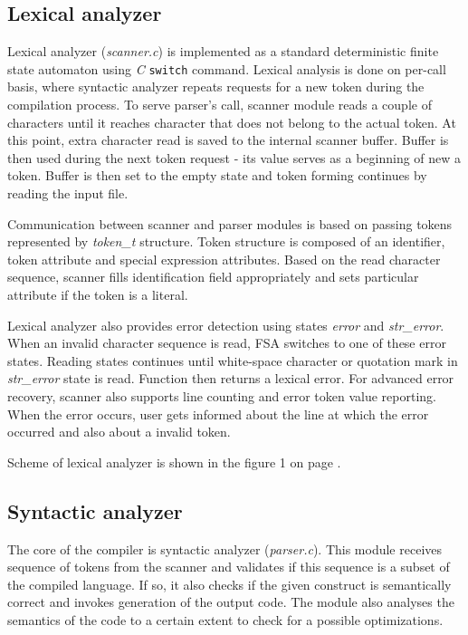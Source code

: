 \documentclass[a4paper, 11pt]{article}
\begin{document}
\subsection{Lexical analyzer}

Lexical analyzer (\emph{scanner.c}) is implemented as a standard deterministic finite state automaton using \emph{C} \texttt{switch} command. Lexical analysis is done on per-call basis, where syntactic analyzer repeats requests for a new token during the compilation process. To serve parser's call, scanner module reads a couple of characters until it reaches character that does not belong to the actual token. At this point, extra character read is saved to the internal scanner buffer. Buffer is then used during the next token request - its value serves as a beginning of new a token. Buffer is then set to the empty state and token forming continues by reading the input file.

Communication between scanner and parser modules is based on passing tokens represented by \emph{token\_t} structure. Token structure is composed of an identifier, token attribute and special expression attributes. Based on the read character sequence, scanner fills identification field appropriately and sets particular attribute if the token is a literal.

Lexical analyzer also provides error detection using states \emph{error} and \emph{str\_error}. When an invalid character sequence is read, FSA switches to one of these error states. Reading states continues until white-space character or quotation mark in \emph{str\_error} state is read. Function then returns a lexical error. For advanced error recovery, scanner also supports line counting and error token value reporting. When the error occurs, user gets informed about the line at which the error occurred and also about a invalid token.

\vskip 0.5cm
\noindent Scheme of lexical analyzer is shown in the figure 1 on page \pageref{fig:scanner_scheme}.

\subsection{Syntactic analyzer}

The core of the compiler is syntactic analyzer (\emph{parser.c}). This module receives sequence of tokens from the scanner and validates if this sequence is a subset of the compiled language. If so, it also checks if the given construct is semantically correct and invokes generation of the output code. The module also analyses the semantics of the code to a certain extent to check for a possible optimizations.
\end{document}
